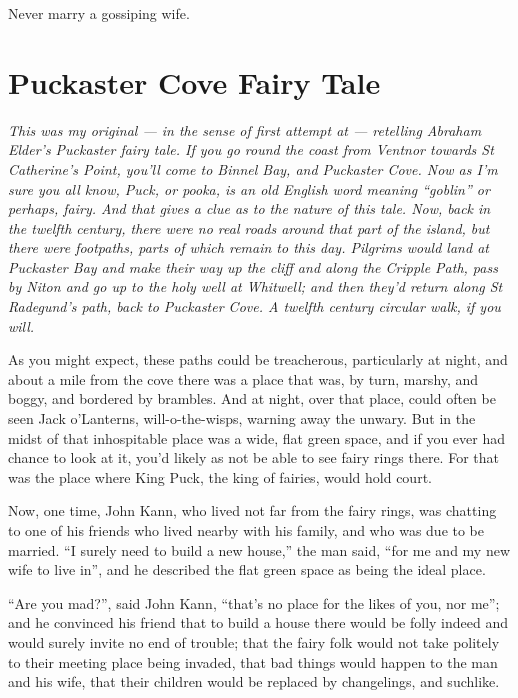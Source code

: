 \documentclass[
  12pt,
  a5paper,
  twoside]{book}
\begin{document}
Never marry a gossiping wife.


\chapter{Puckaster Cove Fairy Tale}\label{puckaster-cove-fairy-tale}

\emph{This was my original --- in the sense of first attempt at ---
retelling Abraham Elder's Puckaster fairy tale. If you go round the
coast from Ventnor towards St Catherine's Point, you'll come to Binnel
Bay, and Puckaster Cove. Now as I'm sure you all know, Puck, or pooka,
is an old English word meaning ``goblin'' or perhaps, fairy. And that
gives a clue as to the nature of this tale. Now, back in the twelfth
century, there were no real roads around that part of the island, but
there were footpaths, parts of which remain to this day. Pilgrims would
land at Puckaster Bay and make their way up the cliff and along the
Cripple Path, pass by Niton and go up to the holy well at Whitwell; and
then they'd return along St Radegund's path, back to Puckaster Cove. A
twelfth century circular walk, if you will.}

As you might expect, these paths could be treacherous, particularly at
night, and about a mile from the cove there was a place that was, by
turn, marshy, and boggy, and bordered by brambles. And at night, over
that place, could often be seen Jack o'Lanterns, will-o-the-wisps,
warning away the unwary. But in the midst of that inhospitable place was
a wide, flat green space, and if you ever had chance to look at it,
you'd likely as not be able to see fairy rings there. For that was the
place where King Puck, the king of fairies, would hold court.

Now, one time, John Kann, who lived not far from the fairy rings, was
chatting to one of his friends who lived nearby with his family, and who
was due to be married. ``I surely need to build a new house,'' the man
said, ``for me and my new wife to live in'', and he described the flat
green space as being the ideal place.

``Are you mad?'', said John Kann, ``that's no place for the likes of
you, nor me''; and he convinced his friend that to build a house there
would be folly indeed and would surely invite no end of trouble; that
the fairy folk would not take politely to their meeting place being
invaded, that bad things would happen to the man and his wife, that
their children would be replaced by changelings, and suchlike.
\end{document}
